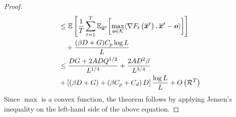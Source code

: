 \begin{proof}
\begin{align*}
    &\leq \mathbb{E} \left[ \frac{1}{T} \sum_{t=1}^T  \mathbb{E}_{\overline{\bm{x}}^t}{\left[ \max_{\bm{o} \in \mathcal{K}} \langle \nabla F_t\left( \overline{\bm{x}}^t \right), \overline{\bm{x}}^t - \bm{o} \rangle \right]} \right] \\
    & \quad + \frac{(\beta D + G)C_p \log L}{L} \\
    &\leq \frac{DG + 2ADQ^{1/2}}{L^{1/4}} + \frac{2AD^2\beta}{L^{3/4}} \\
    &+\left[ \left(\beta D + G\right) + \left(\beta C_p + C_d\right)D \right]  \frac{\log L }{L} + O \left(\mathcal{R}^T \right) 
\end{align*}
%
Since $\max$ is a convex function, the theorem follows by applying Jensen's inequality on the left-hand side of the above equation.
\end{proof}
